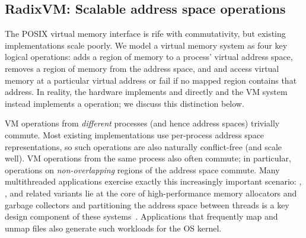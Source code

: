 \subsection{RadixVM: Scalable address space operations}


The POSIX virtual memory interface is rife with commutativity, but
existing implementations scale poorly.  We model a virtual memory
system as four key logical operations:  adds a region of
memory to a process' virtual address space,  removes a
region of memory from the address space, and  and
 access virtual memory at a particular virtual address
or fail if no mapped region contains that address.  In reality, the
hardware implements  and  directly and
the VM system instead implements a  operation; we
discuss this distinction below.



VM operations from \emph{different} processes (and hence address
spaces) trivially commute.  Most existing implementations use
per-process address space representations, so such operations are also
naturally conflict-free (and scale well).  VM operations from the same
process also often commute; in particular, operations on
\emph{non-overlapping} regions of the address space commute.
%
Many multithreaded applications exercise exactly this increasingly
important scenario: , , and related variants
lie at the core of high-performance memory allocators and garbage
collectors and partitioning the address space between threads is a key
design component of these
systems~\cite{ssmalloc:apsys,jemalloc,tcmalloc}.  Applications that
frequently map and unmap files also generate such workloads for the OS
kernel.

